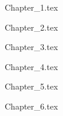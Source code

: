 \documentclass[a4paper,oneside]{book}
\begin{document}
 {Chapter_1.tex}

 {Chapter_2.tex}

 {Chapter_3.tex}

 {Chapter_4.tex}

 {Chapter_5.tex}

 {Chapter_6.tex}

%

\end{document}
